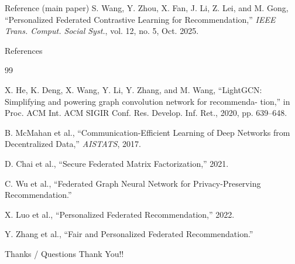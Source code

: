 \documentclass{beamer}
\begin{document}
\begin{frame}{Reference (main paper)}
  S. Wang, Y. Zhou, X. Fan, J. Li, Z. Lei, and M. Gong, “Personalized Federated Contrastive Learning for Recommendation,” \emph{IEEE Trans. Comput. Social Syst.}, vol. 12, no. 5, Oct. 2025.\\[6pt]
\end{frame}


\begin{frame}{References}
\small
\begin{thebibliography}{99}

X. He, K. Deng, X. Wang, Y. Li, Y. Zhang, and M. Wang, “LightGCN:
Simplifying and powering graph convolution network for recommenda-
tion,” in Proc. ACM Int. ACM SIGIR Conf. Res. Develop. Inf. Ret., 2020,
pp. 639–648.

B. McMahan et al.,
“Communication-Efficient Learning of Deep Networks from Decentralized Data,”
\emph{AISTATS}, 2017.

D. Chai et al.,
“Secure Federated Matrix Factorization,” 2021.

C. Wu et al.,
“Federated Graph Neural Network for Privacy-Preserving Recommendation.”

X. Luo et al.,
“Personalized Federated Recommendation,” 2022.

Y. Zhang et al.,
“Fair and Personalized Federated Recommendation.”

\end{thebibliography}
\end{frame}


\begin{frame}{Thanks / Questions}
  \centering
    Thank You!!
\end{frame}
\end{document}
